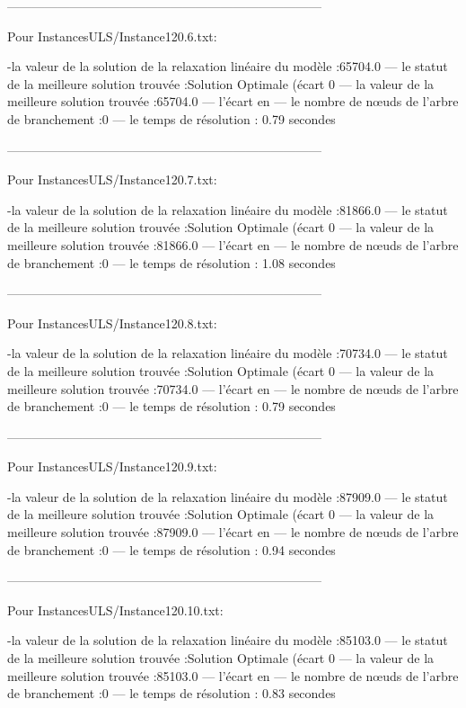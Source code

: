 ---------------------------------------------------------------------------

Pour InstancesULS/Instance120.6.txt:


-la valeur de la solution de la relaxation linéaire du modèle :65704.0
— le statut de la meilleure solution trouvée :Solution Optimale (écart 0%
— la valeur de la meilleure solution trouvée :65704.0
— l’écart en %
— le nombre de nœuds de l’arbre de branchement :0
— le temps de résolution : 0.79 secondes

---------------------------------------------------------------------------

Pour InstancesULS/Instance120.7.txt:


-la valeur de la solution de la relaxation linéaire du modèle :81866.0
— le statut de la meilleure solution trouvée :Solution Optimale (écart 0%
— la valeur de la meilleure solution trouvée :81866.0
— l’écart en %
— le nombre de nœuds de l’arbre de branchement :0
— le temps de résolution : 1.08 secondes

---------------------------------------------------------------------------

Pour InstancesULS/Instance120.8.txt:


-la valeur de la solution de la relaxation linéaire du modèle :70734.0
— le statut de la meilleure solution trouvée :Solution Optimale (écart 0%
— la valeur de la meilleure solution trouvée :70734.0
— l’écart en %
— le nombre de nœuds de l’arbre de branchement :0
— le temps de résolution : 0.79 secondes



---------------------------------------------------------------------------

Pour InstancesULS/Instance120.9.txt:


-la valeur de la solution de la relaxation linéaire du modèle :87909.0
— le statut de la meilleure solution trouvée :Solution Optimale (écart 0%
— la valeur de la meilleure solution trouvée :87909.0
— l’écart en %
— le nombre de nœuds de l’arbre de branchement :0
— le temps de résolution : 0.94 secondes


---------------------------------------------------------------------------

Pour InstancesULS/Instance120.10.txt:


-la valeur de la solution de la relaxation linéaire du modèle :85103.0
— le statut de la meilleure solution trouvée :Solution Optimale (écart 0%
— la valeur de la meilleure solution trouvée :85103.0
— l’écart en %
— le nombre de nœuds de l’arbre de branchement :0
— le temps de résolution : 0.83 secondes


